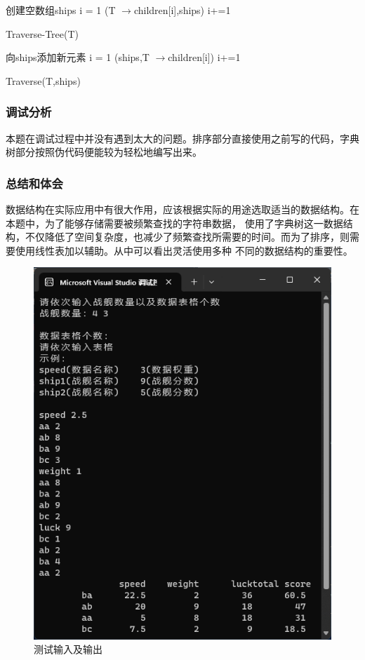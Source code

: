 \begin{function}[H]
     创建空数组ships\;
     i = 1\;
     {
        \Traverse(T $\rightarrow$children[i],ships)\;
        i+=1\;
     }
    \caption{Traverse-Tree(T)}
\end{function}
\begin{function}
    {向ships添加新元素}
     i = 1\;
     {
        \Traverse(ships,T $\rightarrow$children[i])\;
        i+=1\;
     }
    \caption{Traverse(T,ships)}
\end{function}
\subsubsection{调试分析}
本题在调试过程中并没有遇到太大的问题。排序部分直接使用之前写的代码，字典树部分按照伪代码便能较为轻松地编写出来。
\subsubsection{总结和体会}
数据结构在实际应用中有很大作用，应该根据实际的用途选取适当的数据结构。在本题中，为了能够存储需要被频繁查找的字符串数据，
使用了字典树这一数据结构，不仅降低了空间复杂度，也减少了频繁查找所需要的时间。而为了排序，则需要使用线性表加以辅助。从中可以看出灵活使用多种
不同的数据结构的重要性。
\begin{figure}
    \centering
    \includegraphics[scale=0.75]{pic1.png}
    \caption{测试输入及输出}
\end{figure}
